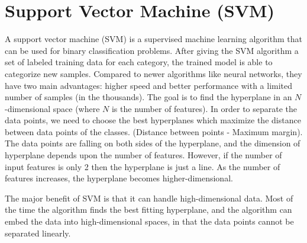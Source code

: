 \documentclass[english,12pt,oneside,a4paper]{article}
\begin{document}
		\section{Support Vector Machine (SVM)}
		A support vector machine (SVM) is a supervised machine learning algorithm that can be used for binary classification problems. After giving the SVM algorithm a set of labeled training data for each category, the trained model is able to categorize new samples. Compared to newer algorithms like neural networks, they have two main advantages: higher speed and better performance with a limited number of samples (in the thousands).
		The goal is to find the hyperplane in an $N$-dimensional space (where $N$ is the number of features). In order to separate the data points, we need to choose the best hyperplanes which maximize the distance between data points of the classes. (Distance between points - Maximum margin). The data points are falling on both sides of the hyperplane, and the dimension of hyperplane depends upon the number of features. However, if the number of input features is only 2 then the hyperplane is just a line. As the number of features increases, the hyperplane becomes higher-dimensional.
		
		The major benefit of SVM is that it can handle high-dimensional data. Most of the time the algorithm finds the best fitting hyperplane, and the algorithm can embed the data into high-dimensional spaces, in that the data points cannot be separated linearly. 
		
\end{document}
